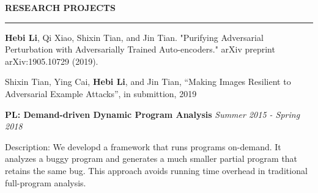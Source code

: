 \documentclass[10pt,letterpaper]{article}
\newenvironment{mysection}[1]{ %
  \medskip
  \MakeUppercase{\bf #1}
  \medskip
  \hrule
  \medskip
  \begin{list}{}{
      \setlength{\leftmargin}{1.5em}
    }
  \item[]
}{
  \end{list}
}
\begin{document}
\begin{mysection}{Research Projects}
  \textbf{Hebi Li}, Qi Xiao, Shixin Tian, and Jin Tian. "Purifying
  Adversarial Perturbation with Adversarially Trained Auto-encoders."
  arXiv preprint arXiv:1905.10729 (2019).

  Shixin Tian, Ying Cai, \textbf{Hebi Li}, and Jin Tian, ``Making
  Images Resilient to Adversarial Example Attacks'', in submittion,
  2019

  \textbf{PL: Demand-driven Dynamic Program Analysis} \hfill \emph{Summer 2015 - Spring 2018}

  
  Description: We developd a framework that runs programs on-demand.
  It analyzes a buggy program and generates a much smaller partial
  program that retains the same bug. This approach avoids running time
  overhead in traditional full-program analysis.




\end{mysection}
\end{document}
